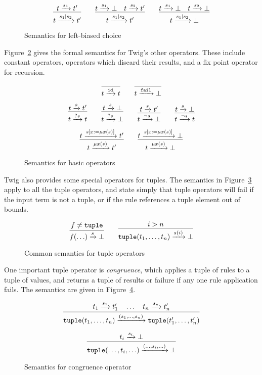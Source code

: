 \begin{figure}[ht]
\label{semantics:choice}
\[
\infer{t \arr{s_1|s_2} t'}{t \arr{s_1} t'}
\qquad 
\infer{t \arr{s_1|s_2} t'}{t \arr{s_1} \bot \quad t \arr{s_2} t'}
\qquad
\infer{t \arr{s_1|s_2} \bot}{t \arr{s_1} \bot \quad t \arr{s_2} \bot}
\]
\caption{Semantics for left-biased choice}
\end{figure}

Figure~\ref{semantics:basic} gives the formal semantics for Twig's other
operators. These include constant operators, operators which discard their
results, and a fix point operator for recursion.

\begin{figure}[ht]
\label{semantics:basic}
\[
\infer{t \arr{\mathtt{id}} t}{}
\qquad
\infer{t \arr{\mathtt{fail}} \bot}{}
\]

\[
\infer{t \arr{?s} t}{t \arr{s} t'}
\qquad 
\infer{t \arr{?s} \bot}{t \arr{s} \bot}
\qquad
\infer{t \arr{\lnot s} \bot}{t \arr{s} t'}
\qquad 
\infer{t \arr{\lnot s} t}{t \arr{s} \bot}
\]

\[
\infer{t \arr{\mu x(s)} t'}{t \arr{s[x := \mu x(s)]} t'}
\qquad 
\infer{t \arr{\mu x(s)} \bot}{t \arr{s[x := \mu x(s)]} \bot}
\]
\caption{Semantics for basic operators}
\end{figure}

Twig also provides some special operators for tuples. The semantics in
Figure~\ref{semantics:all-tuples} apply to all the tuple operators, and state
simply that tuple operators will fail if the input term is not a tuple, or if
the rule references a tuple element out of bounds.

\begin{figure}[ht]
\label{semantics:all-tuples}
\[
\infer{f(\ldots) \arr{s} \bot}
{f \neq \mathtt{tuple}}
\qquad
\infer{\mathtt{tuple}(t_1,\ldots,t_n) \arr{s(i)} \bot}{i > n}
\]
\caption{Common semantics for tuple operators}
\end{figure}

One important tuple operator is \emph{congruence}, which applies a tuple of
rules to a tuple of values, and returns a tuple of results or failure if any
one rule application fails. The semantics are given in
Figure~\ref{semantics:congruence}.

\begin{figure}[ht]
\label{semantics:congruence}
\[
\infer{
\mathtt{tuple}(t_1,\ldots,t_n)
\arr{(s_1,\ldots,s_n)}
\mathtt{tuple}(t_1',\ldots,t_n') }
{t_1 \arr{s_1} t_1' \quad \ldots \quad t_n \arr{s_n} t_n'}
\]

\[
\infer{
\mathtt{tuple}(\ldots,t_i,\ldots)
\arr{(\ldots,s_i,\ldots)}
\bot}
{t_i \arr{s_i} \bot}
\]
\caption{Semantics for congruence operator}
\end{figure}

